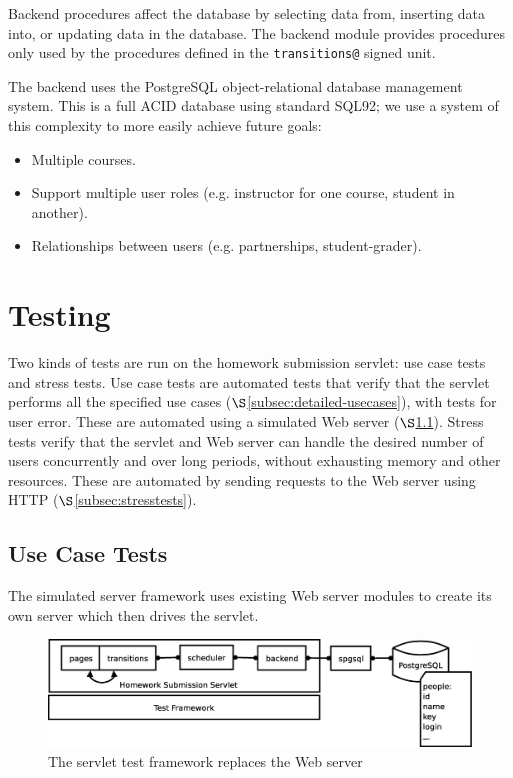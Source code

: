 \documentclass[a4paper]{article}
\begin{document}
Backend procedures affect the database by selecting data from, inserting data
into, or updating data in the database. The backend module provides procedures
only used by the procedures defined in the \verb|transitions@| signed unit.

The backend uses the PostgreSQL object-relational database management system.
This is a full ACID database using standard SQL92; we use a system of this
complexity to more easily achieve future goals:

\begin{itemize}
\item{Multiple courses.}
\item{Support multiple user roles (e.g. instructor for one course, student in
another).}
\item{Relationships between users (e.g. partnerships, student-grader).}
\end{itemize}

\section{Testing}\label{sec:tests}

Two kinds of tests are run on the homework submission servlet: use case tests
and stress tests. Use case tests are automated tests that verify that the
servlet performs all the specified use cases
($\S$\ref{subsec:detailed-usecases}), with tests for user error. These are
automated using a simulated Web server ($\S$\ref{subsec:use-case-tests}).
Stress tests verify that the servlet and Web server can handle the desired
number of users concurrently and over long periods, without exhausting memory
and other resources.  These are automated by sending requests to the Web server
using HTTP ($\S$\ref{subsec:stresstests}).

\subsection{Use Case Tests}\label{subsec:use-case-tests}

The simulated server framework uses existing Web server modules to create its
own server which then drives the servlet.

\begin{figure}[ht]
\centering
\includegraphics[scale=.30]{servlet-test.eps}
\caption{The servlet test framework replaces the Web server}
\label{fig:servlet-tests}
\end{figure}
\end{document}
